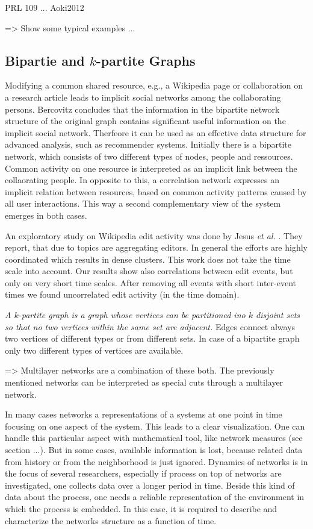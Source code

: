 \documentclass[a4paper,10pt]{scrbook}
\begin{document}
PRL 109 ... Aoki2012

=> Show some typical examples ...

\subsection{Bipartie and $k$-partite Graphs}

Modifying a common shared resource, e.g., a Wikipedia page or collaboration on a research article leads to implicit social networks among the collaborating persons.  Bercovitz \cite{Bercovitz} concludes that the information in the bipartite network structure of the original graph contains significant useful information on the implicit social network. Therfeore it can be used as an effective data structure for advanced analysis, such as recommender systems. Initially there is a bipartite network, which consists of two different types of nodes, people and ressources. Common activity on one resource is interpreted as an implicit link between the collaorating people. In opposite to this, a correlation network expresses an implicit relation between resources, based on common activity patterns caused by all user interactions. This way a second complementary view of the system emerges in both cases. 

An exploratory study on Wikipedia edit activity was done by Jesus \textit{et al.}  \cite{Jesus2009}. They report, that due to topics are aggregating editors. In general the efforts are highly coordinated which results in dense clusters. This work does not take the time scale into account. Our results show also correlations between edit events, but only on very short time scales. After removing all events with short inter-event times we found uncorrelated edit activity (in the time domain).

\textit{ A $k$-partite graph is a graph whose vertices can be partitioned ino $k$ disjoint sets so that no two vertices within the same set are adjacent.} Edges connect always two vertices of different types or from different sets. In case of a bipartite graph only two different types of vertices are available. 

=> Multilayer networks are a combination of these both. The previously mentioned networks can be interpreted as special cuts through a multilayer network.

In many cases networks a representations of a systems at one point in time focusing on one aspect of the system. This leads to a clear visualization. One can handle this particular aspect with mathematical tool, like network measures (see section ...). But in some cases, available information is lost, because related data from history or from the neighborhood is just ignored. Dynamics of networks is in the focus of several researchers, especially if process on top of networks are investigated, one collects data over a longer period in time. Beside this kind of data about the process, one needs a reliable representation of the environment in which the process is embedded. In this case, it is required to describe and characterize the networks structure as a function of time.
\end{document}
